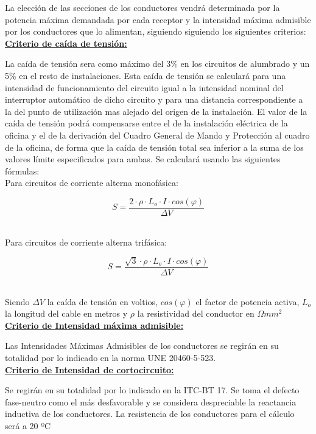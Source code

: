 \pagebreak

La elección de las secciones de los conductores vendrá determinada por la potencia máxima demandada por cada receptor y la intensidad máxima admisible por los conductores que lo alimentan, siguiendo siguiendo los siguientes criterios:\\

\underline{\bfseries Criterio de caída de tensión:}\

La caída de tensión sera como máximo del 3\% en los circuitos de alumbrado y un 5\% en el resto de instalaciones. Esta caída de tensión se calculará para una intensidad de funcionamiento del circuito igual a la intensidad nominal del interruptor automático de dicho circuito y para una distancia correspondiente a la del punto de utilización mas alejado del origen de la instalación. El valor de la caída de tensión podrá compensarse entre el de la instalación eléctrica de la oficina y el de la derivación del Cuadro General de Mando y Protección al cuadro de la oficina, de forma que la caída de tensión total sea inferior a la suma de los valores límite especificados para ambas. Se calculará usando las siguientes fórmulas:\\

Para circuitos de corriente alterna monofásica:\

$$ S=\frac{2\cdot \rho \cdot L_o	\cdot I\cdot cos(\varphi)}{\Delta V}$$\

Para circuitos de corriente alterna trifásica:\

$$ S=\frac{\sqrt{3} \cdot \rho \cdot L_o \cdot I\cdot cos(\varphi)}{\Delta V}$$\

Siendo $\Delta V$ la caída de tensión en voltios, $cos(\varphi)$ el factor de potencia activa, $L_o$ la longitud del cable en metros y $\rho$ la resistividad del conductor en $\Omega mm^2$\\


\underline{\bfseries Criterio de Intensidad máxima admisible:}\

Las Intensidades Máximas Admisibles de los conductores se regirán en su totalidad por lo indicado en la norma UNE 20460-5-523.\\

\underline{\bfseries Criterio de Intensidad de cortocircuito:}\

Se regirán en su totalidad por lo indicado en la ITC-BT 17. Se toma el defecto fase-neutro como el más desfavorable y se considera despreciable la reactancia inductiva de los conductores. La resistencia de los conductores para el cálculo será a 20 ºC\\
\pagebreak

